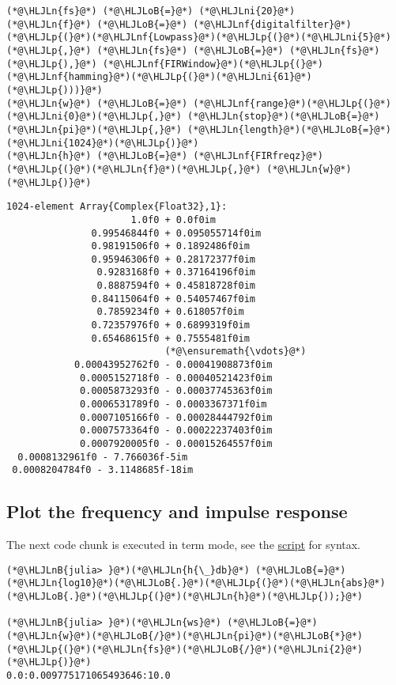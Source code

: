 \documentclass[12pt,a4paper]{article}
\newcommand{\HLJLn}[1]{#1}
\newcommand{\HLJLnf}[1]{\textcolor[RGB]{66,102,213}{#1}}
\newcommand{\HLJLnB}[1]{\textcolor[RGB]{59,151,46}{#1}}
\newcommand{\HLJLni}[1]{\textcolor[RGB]{59,151,46}{#1}}
\newcommand{\HLJLoB}[1]{\textcolor[RGB]{102,102,102}{\textbf{#1}}}
\newcommand{\HLJLp}[1]{#1}
\begin{document}
\begin{lstlisting}
(*@\HLJLn{fs}@*) (*@\HLJLoB{=}@*) (*@\HLJLni{20}@*)
(*@\HLJLn{f}@*) (*@\HLJLoB{=}@*) (*@\HLJLnf{digitalfilter}@*)(*@\HLJLp{(}@*)(*@\HLJLnf{Lowpass}@*)(*@\HLJLp{(}@*)(*@\HLJLni{5}@*)(*@\HLJLp{,}@*) (*@\HLJLn{fs}@*) (*@\HLJLoB{=}@*) (*@\HLJLn{fs}@*)(*@\HLJLp{),}@*) (*@\HLJLnf{FIRWindow}@*)(*@\HLJLp{(}@*)(*@\HLJLnf{hamming}@*)(*@\HLJLp{(}@*)(*@\HLJLni{61}@*)(*@\HLJLp{)))}@*)
(*@\HLJLn{w}@*) (*@\HLJLoB{=}@*) (*@\HLJLnf{range}@*)(*@\HLJLp{(}@*)(*@\HLJLni{0}@*)(*@\HLJLp{,}@*) (*@\HLJLn{stop}@*)(*@\HLJLoB{=}@*)(*@\HLJLn{pi}@*)(*@\HLJLp{,}@*) (*@\HLJLn{length}@*)(*@\HLJLoB{=}@*)(*@\HLJLni{1024}@*)(*@\HLJLp{)}@*)
(*@\HLJLn{h}@*) (*@\HLJLoB{=}@*) (*@\HLJLnf{FIRfreqz}@*)(*@\HLJLp{(}@*)(*@\HLJLn{f}@*)(*@\HLJLp{,}@*) (*@\HLJLn{w}@*)(*@\HLJLp{)}@*)
\end{lstlisting}

\begin{lstlisting}
1024-element Array{Complex{Float32},1}:
                      1.0f0 + 0.0f0im          
               0.99546844f0 + 0.095055714f0im  
               0.98191506f0 + 0.1892486f0im    
               0.95946306f0 + 0.28172377f0im   
                0.9283168f0 + 0.37164196f0im   
                0.8887594f0 + 0.45818728f0im   
               0.84115064f0 + 0.54057467f0im   
                0.7859234f0 + 0.618057f0im     
               0.72357976f0 + 0.6899319f0im    
               0.65468615f0 + 0.7555481f0im    
                            (*@\ensuremath{\vdots}@*)                  
            0.00043952762f0 - 0.00041908873f0im
             0.0005152718f0 - 0.00040521423f0im
             0.0005873293f0 - 0.00037745363f0im
             0.0006531789f0 - 0.0003367371f0im 
             0.0007105166f0 - 0.00028444792f0im
             0.0007573364f0 - 0.00022237403f0im
             0.0007920005f0 - 0.00015264557f0im
  0.0008132961f0 - 7.766036f-5im               
 0.0008204784f0 - 3.1148685f-18im
\end{lstlisting}


\subsection{Plot the frequency and impulse response}

The next code chunk is executed in term mode, see the \href{FIR_design.jl}{script} for syntax.


\begin{lstlisting}
(*@\HLJLnB{julia> }@*)(*@\HLJLn{h{\_}db}@*) (*@\HLJLoB{=}@*) (*@\HLJLn{log10}@*)(*@\HLJLoB{.}@*)(*@\HLJLp{(}@*)(*@\HLJLn{abs}@*)(*@\HLJLoB{.}@*)(*@\HLJLp{(}@*)(*@\HLJLn{h}@*)(*@\HLJLp{));}@*)

(*@\HLJLnB{julia> }@*)(*@\HLJLn{ws}@*) (*@\HLJLoB{=}@*) (*@\HLJLn{w}@*)(*@\HLJLoB{/}@*)(*@\HLJLn{pi}@*)(*@\HLJLoB{*}@*)(*@\HLJLp{(}@*)(*@\HLJLn{fs}@*)(*@\HLJLoB{/}@*)(*@\HLJLni{2}@*)(*@\HLJLp{)}@*)
0.0:0.009775171065493646:10.0
\end{lstlisting}
\end{document}
